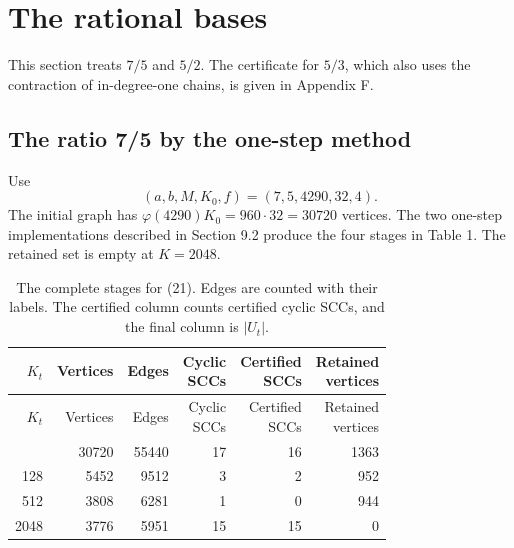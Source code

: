 \documentclass[11pt,reqno]{amsart}
\theoremstyle{definition}
\theoremstyle{remark}
\begin{document}
\section{The rational bases}\label{sec:5}

This section treats \(7/5\) and \(5/2\). The certificate for \(5/3\),
which also uses the contraction of in-degree-one chains, is given in
Appendix F.

\subsection{The ratio 7/5 by the one-step method}\label{sec:5.1}

Use
\[
(a,b,M,K_0,f)=(7,5,4290,32,4).
\tag{21}\label{eq:21}
\]
The initial graph has \(\varphi(4290)K_0=960\cdot32=30720\) vertices.
The two one-step implementations described in Section 9.2 produce
the four stages in Table 1. The retained set is empty at \(K=2048\).


\begingroup
\small
\setlength{\tabcolsep}{4pt}
\renewcommand{\arraystretch}{1.15}
\setlength{\LTcapwidth}{\textwidth}
\begin{longtable}{@{} r r r r r r@{}}
\caption{The complete stages for (21). Edges are counted with their
labels. The certified column counts certified cyclic SCCs, and the final
column is \(|U_t|\).}\label{tab:1}\\
\toprule
\(K_t\) & Vertices & Edges & \shortstack[r]{Cyclic\\SCCs} & \shortstack[r]{Certified\\SCCs} & \shortstack[r]{Retained\\vertices} \\
\midrule
\endfirsthead
\toprule
\(K_t\) & Vertices & Edges & \shortstack[r]{Cyclic\\SCCs} & \shortstack[r]{Certified\\SCCs} & \shortstack[r]{Retained\\vertices} \\
\midrule
\endhead
\bottomrule
\endlastfoot
32 & 30720 & 55440 & 17 & 16 & 1363 \\*
128 & 5452 & 9512 & 3 & 2 & 952 \\*
512 & 3808 & 6281 & 1 & 0 & 944 \\*
2048 & 3776 & 5951 & 15 & 15 & 0 \\
\end{longtable}
\endgroup
\end{document}
